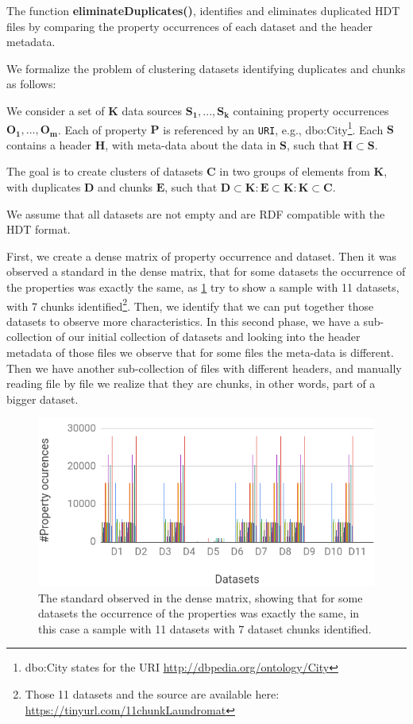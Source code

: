 \documentclass[sw]{iosart2x}
\begin{document}
The function \textbf{eliminateDuplicates()}, identifies and eliminates duplicated HDT files by comparing the property occurrences of each dataset and the header metadata.

We formalize the problem of clustering datasets identifying duplicates and chunks as follows:

We consider a set of $\mathbf{K}$ data sources $\mathbf{S_1}, . . . , \mathbf{S_k}$ containing property occurrences $\mathbf{O_1}, . . . , \mathbf{O_m}$.
Each of property $\mathbf{P}$ is referenced by an \texttt{URI}, e.g., dbo:City\footnote{dbo:City states for the URI \url{http://dbpedia.org/ontology/City}}. Each $\mathbf{S}$ contains a header $\mathbf{H}$, with meta-data about the data in $\mathbf{S}$, such that $\mathbf{H} \subset \mathbf{S}$.

The goal is to create clusters of datasets $\mathbf{C}$ in two groups of elements from $\mathbf{K}$, with duplicates $\mathbf{D}$ and chunks $\mathbf{E}$, such that $\mathbf{D} \subset \mathbf{K} : \mathbf{E} \subset \mathbf{K} : \mathbf{K} \subset \mathbf{C}$.

We assume that all datasets are not empty and are RDF compatible with the HDT format.

First, we create a dense matrix of property occurrence and dataset. Then it was observed a standard in the dense matrix, that for some datasets the occurrence of the properties was exactly the same, as  \cref{fig:propOccurence} try to show a sample with 11 datasets, with 7 chunks identified\footnote{Those 11 datasets and the source are available here: \url{https://tinyurl.com/11chunkLaundromat}}. Then, we identify that we can put together those datasets to observe more characteristics.
In this second phase, we have a sub-collection of our initial collection of datasets and looking into the header metadata of those files we observe that for some files the meta-data is different.
Then we have another sub-collection of files with different headers, and manually reading file by file we realize that they are chunks, in other words, part of a bigger dataset. 

\begin{figure}[htb] 
    \centering
 	\includegraphics[width=0.8\linewidth]{img/propertyOccurence.png}
 	\caption{The standard observed in the dense matrix, showing that for some datasets the occurrence of the properties was exactly the same, in this case a sample with 11 datasets with 7 dataset chunks identified.}
 	\label{fig:propOccurence}
\end{figure}
\end{document}
